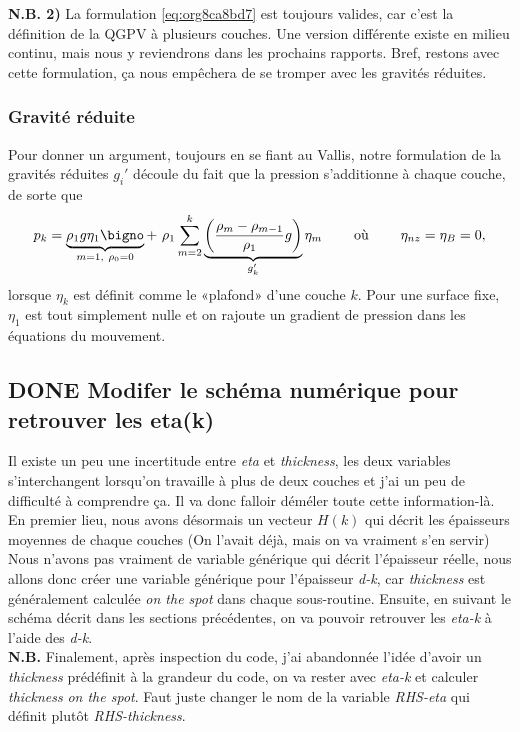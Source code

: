 \documentclass[10pt]{article}
\numberwithin{equation}{section}
\begin{document}
\textbf{N.B. 2)} La formulation \ref{eq:org8ca8bd7} est toujours valides, car c'est la définition de la QGPV à plusieurs couches.
Une version différente existe en milieu continu, mais nous y reviendrons dans les prochains rapports.
Bref, restons avec cette formulation, ça nous empêchera de se tromper avec les gravités réduites.
\subsubsection{Gravité réduite}
\label{sec:org93f8491}

Pour donner un argument, toujours en se fiant au Vallis, notre formulation de la gravités réduites \(g_i'\) découle du fait que la pression s'additionne à chaque couche, de sorte que 
\begin{equation}
p_{k} = \underbrace{\rho_1 g \eta_1\bigno}_{m=1,\ \rho_0=0} + \ \rho_1 \sum_{m=2}^k \underbrace{\qty(\frac{\rho_m - \rho_{m-1}}{\rho_1} g)}_{g_k'} \eta_m
\hspace{0.8cm} \text{où}\hspace{0.8cm}
\eta_{nz} = \eta_B = 0,
\end{equation}
lorsque \(\eta_k\) est définit comme le «plafond» d'une couche \(k\).
Pour une surface fixe, \(\eta_1\) est tout simplement nulle et on rajoute un gradient de pression dans les équations du mouvement.
\subsection{{\bfseries\sffamily DONE} Modifer le schéma numérique pour retrouver les eta(k)}
\label{sec:org72ef389}
Il existe un peu une incertitude entre \emph{eta} et \emph{thickness}, les deux variables s'interchangent lorsqu'on travaille à plus de deux couches et j'ai un peu de difficulté à comprendre ça.
Il va donc falloir déméler toute cette information-là.
En premier lieu, nous avons désormais un vecteur \(H(k)\) qui décrit les épaisseurs moyennes de chaque couches (On l'avait déjà, mais on va vraiment s'en servir)
Nous n'avons pas vraiment de variable générique qui décrit l'épaisseur réelle, nous allons donc créer une variable générique pour l'épaisseur \emph{d-k}, car \emph{thickness} est généralement calculée \emph{on the spot} dans chaque sous-routine.
Ensuite, en suivant le schéma décrit dans les sections précédentes, on va pouvoir retrouver les \emph{eta-k} à l'aide des \emph{d-k}.\\

\textbf{N.B.} Finalement, après inspection du code, j'ai abandonnée l'idée d'avoir un \emph{thickness} prédéfinit à la grandeur du code, on va rester avec \emph{eta-k} et calculer \emph{thickness} \emph{on the spot}. Faut juste changer le nom de la variable \emph{RHS-eta} qui définit plutôt \emph{RHS-thickness}. 
\end{document}
